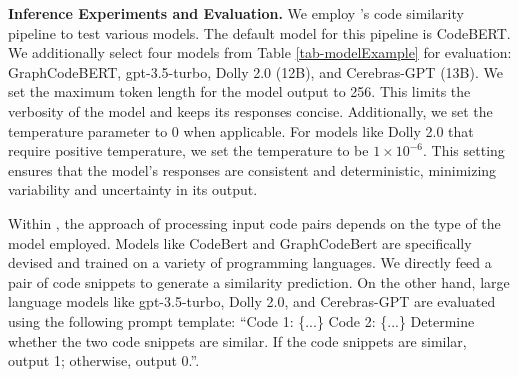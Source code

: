 \textbf{Inference Experiments and Evaluation.}
We employ \ourwork's code similarity pipeline to test various models. 
The default model for this pipeline is CodeBERT. We additionally select four models from Table \ref{tab-modelExample} for evaluation: GraphCodeBERT, gpt-3.5-turbo, Dolly 2.0 (12B), and Cerebras-GPT (13B). 
We set the maximum token length for the model output to 256. This limits the verbosity of the model and keeps its responses concise. Additionally, we set the temperature parameter to 0 when applicable. For models like Dolly 2.0 that require positive temperature, we set the temperature to be $1\times 10^{-6}$. This setting ensures that the model's responses are consistent and deterministic, minimizing variability and uncertainty in its output. 


Within \ourwork, the approach of processing input code pairs depends on the type of the model employed. 
Models like CodeBert and GraphCodeBert are specifically devised and trained on a variety of programming languages. We directly feed a pair of code snippets to generate a similarity prediction.
On the other hand, large language models like gpt-3.5-turbo, Dolly 2.0, and Cerebras-GPT are evaluated using the following prompt template: ``Code 1: \{...\} Code 2: \{...\}  Determine whether the two code snippets are similar. If the code snippets are similar, output 1; otherwise, output 0.''.


